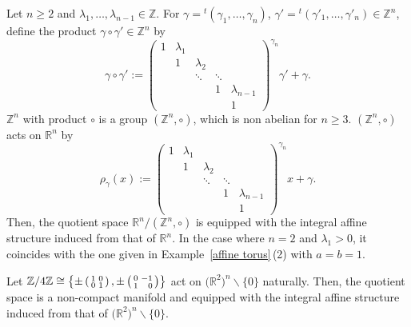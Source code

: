 \documentclass[10pt,a4paper]{amsart}
\numberwithin{equation}{section}
\newcommand{\R}{\mathbb{R}}
\newcommand{\Z}{\mathbb{Z}}
\renewcommand{\setminus}{\smallsetminus}
\begin{document}
\begin{Example}\label{Jordan block}
Let $n\ge 2$ and $\lambda_1,\ldots, \lambda_{n-1}\in \Z$. For $\gamma={}^t(\gamma_1, \ldots, \gamma_n)$, $\gamma'={}^t(\gamma'_1, \ldots, \gamma'_n)\in \Z^n$, define the product $\gamma\circ \gamma' \in \Z^n$ by
\[
\gamma\circ \gamma' :=
\begin{pmatrix}
1 & \lambda_1 & & & \\
 & 1 & \lambda_2 & & \\
 & & \ddots & \ddots & \\
 & & & 1 & \lambda_{n-1}\\
 & & & & 1
\end{pmatrix}^{\gamma_n}
\gamma'+\gamma.
\]
$\Z^n$ with product $\circ$ is a group $(\Z^n,\circ )$, which is non abelian for $n\ge 3$. $(\Z^n,\circ )$ acts on $\R^n$ by
\[
\rho_\gamma (x):=
\begin{pmatrix}
1 & \lambda_1 & & & \\
 & 1 & \lambda_2 & & \\
 & & \ddots & \ddots & \\
 & & & 1 & \lambda_{n-1}\\
 & & & & 1
\end{pmatrix}^{\gamma_n}
x+\gamma.
\]
Then, the quotient space $\R^n/(\Z^n,\circ )$ is equipped with the integral affine structure induced from that of $\R^n$. In the case where $n=2$ and $\lambda_1>0$, it coincides with the one given in Example~\ref{affine torus}\,(2) with $a=b=1$.
\end{Example}

\begin{Example}\label{incomplete}
Let $\Z /4\Z\cong \left\{
\pm \left(\begin{smallmatrix}
1 & 0 \\
0 & 1
\end{smallmatrix}\right),
\pm \left(\begin{smallmatrix}
0 & -1 \\
1 & \hphantom{-}0
\end{smallmatrix}\right)
\right\}$ act on $\bigl(\R^2\bigr)^n\setminus \{ 0\}$ naturally. Then, the quotient space is a non-compact manifold and equipped with the integral affine structure induced from that of $\bigl(\R^2\bigr)^n\setminus \{0\}$.
\end{Example}
\end{document}
